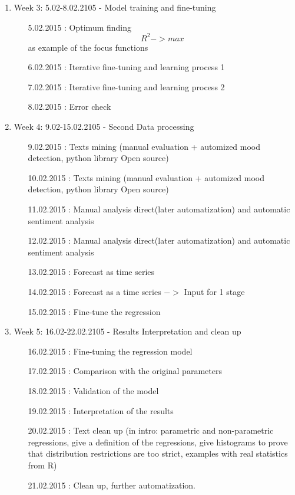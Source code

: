 \documentclass {article}
\begin{document}
\begin{enumerate}
\begin{enumerate}
	\end{enumerate}
	\item Week 3: 5.02-8.02.2105 - Model training and fine-tuning
	\begin{enumerate}
		\item[5.02.2015]: Optimum finding  \[ R^2 -> max \] as example of the focus functions
		\item[6.02.2015]: Iterative fine-tuning and learning process 1
		\item[7.02.2015]: Iterative fine-tuning and learning process 2
		\item[8.02.2015]: Error check
	\end{enumerate}
	\item Week 4: 9.02-15.02.2105 - Second Data processing
	\begin{enumerate}
		\item[9.02.2015]: Texts mining (manual evaluation + automized mood detection, python library Open source) 
		\item[10.02.2015]: Texts mining (manual evaluation + automized mood detection, python library Open source)
		\item[11.02.2015]: Manual analysis direct(later automatization) and automatic sentiment analysis
		\item[12.02.2015]: Manual analysis direct(later automatization) and automatic sentiment analysis
		\item[13.02.2015]: Forecast as time series
		\item[14.02.2015]: Forecast as a time series $->$ Input for 1 stage
		\item[15.02.2015]: Fine-tune the regression
	\end{enumerate}
	\item Week 5: 16.02-22.02.2105 - Results Interpretation and clean up
	\begin{enumerate}
		\item[16.02.2015]: Fine-tuning the regression model
		\item[17.02.2015]: Comparison with the original parameters
		\item[18.02.2015]: Validation of the model
		\item[19.02.2015]: Interpretation of the results
		\item[20.02.2015]: Text clean up (in intro: parametric and non-parametric regressions, give a definition of the regressions, give histograms to prove that distribution restrictions are too strict, examples with real statistics from R)
		\item[21.02.2015]: Clean up, further automatization.
	\end{enumerate}
\end{enumerate}
\end{document}

